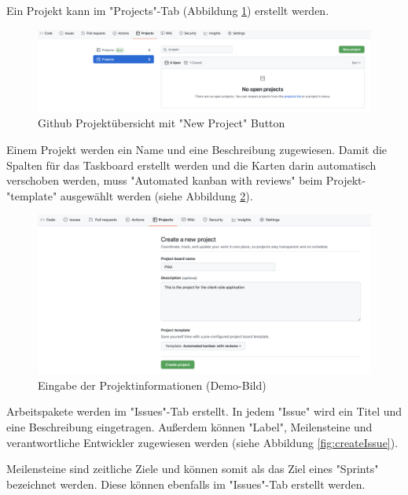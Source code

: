 Ein Projekt kann im "Projects"-Tab (Abbildung \ref{fig:newProject}) erstellt werden.

\begin{figure}[H]
    \centering
    \includegraphics[width=\textwidth]{media/ProjectManagement/CreateProject.png}
    \caption{Github Projektübersicht mit "New Project" Button}
    \label{fig:newProject}
\end{figure}

Einem Projekt werden ein Name und eine Beschreibung zugewiesen. Damit die Spalten für das Taskboard erstellt werden und die Karten darin automatisch verschoben werden, muss  "Automated kanban with reviews" beim Projekt-"template" ausgewählt werden (siehe Abbildung \ref{fig:enterProjectInfo}).

\begin{figure}[H]
    \centering
    \includegraphics[width=\textwidth]{media/ProjectManagement/EnterProjectInfo.png}
    \caption{Eingabe der Projektinformationen (Demo-Bild)}
    \label{fig:enterProjectInfo}
\end{figure}


Arbeitspakete werden im "Issues"-Tab erstellt. In jedem "Issue" wird ein Titel und eine Beschreibung eingetragen. Außerdem können "Label", Meilensteine und verantwortliche Entwickler zugewiesen werden (siehe Abbildung \ref{fig:createIssue}). 

Meilensteine sind zeitliche Ziele und können somit als das Ziel eines "Sprints" bezeichnet werden. Diese können ebenfalls im "Issues"-Tab erstellt werden.

